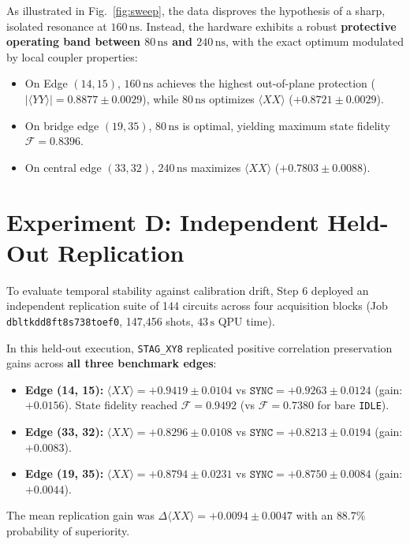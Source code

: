 \documentclass[twocolumn,aps,pra,superscriptaddress,showpacs,floatfix]{revtex4-2}
\begin{document}
As illustrated in Fig.~\ref{fig:sweep}, the data disproves the hypothesis of a sharp, isolated resonance at $160\,\mathrm{ns}$. Instead, the hardware exhibits a robust \textbf{protective operating band between $80\,\mathrm{ns}$ and $240\,\mathrm{ns}$}, with the exact optimum modulated by local coupler properties:
\begin{itemize}
    \item On Edge $(14, 15)$, $160\,\mathrm{ns}$ achieves the highest out-of-plane protection ($|\langle YY \rangle| = 0.8877 \pm 0.0029$), while $80\,\mathrm{ns}$ optimizes $\langle XX \rangle$ ($+0.8721 \pm 0.0029$).
    \item On bridge edge $(19, 35)$, $80\,\mathrm{ns}$ is optimal, yielding maximum state fidelity $\mathcal{F} = 0.8396$.
    \item On central edge $(33, 32)$, $240\,\mathrm{ns}$ maximizes $\langle XX \rangle$ ($+0.7803 \pm 0.0088$).
\end{itemize}

\section{Experiment D: Independent Held-Out Replication}

To evaluate temporal stability against calibration drift, Step 6 deployed an independent replication suite of 144 circuits across four acquisition blocks (Job \texttt{dbltkdd8ft8s738toef0}, 147,456 shots, $43\,\mathrm{s}$ QPU time).

In this held-out execution, \texttt{STAG\_XY8} replicated positive correlation preservation gains across \textbf{all three benchmark edges}:
\begin{itemize}
    \item \textbf{Edge (14, 15):} $\langle XX \rangle = \mathbf{+0.9419 \pm 0.0104}$ vs $\texttt{SYNC} = +0.9263 \pm 0.0124$ (gain: $\mathbf{+0.0156}$). State fidelity reached $\mathcal{F} = 0.9492$ (vs $\mathcal{F} = 0.7380$ for bare \texttt{IDLE}).
    \item \textbf{Edge (33, 32):} $\langle XX \rangle = \mathbf{+0.8296 \pm 0.0108}$ vs $\texttt{SYNC} = +0.8213 \pm 0.0194$ (gain: $\mathbf{+0.0083}$).
    \item \textbf{Edge (19, 35):} $\langle XX \rangle = \mathbf{+0.8794 \pm 0.0231}$ vs $\texttt{SYNC} = +0.8750 \pm 0.0084$ (gain: $\mathbf{+0.0044}$).
\end{itemize}
The mean replication gain was $\Delta \langle XX \rangle = \mathbf{+0.0094 \pm 0.0047}$ with an $88.7\%$ probability of superiority.
\end{document}

